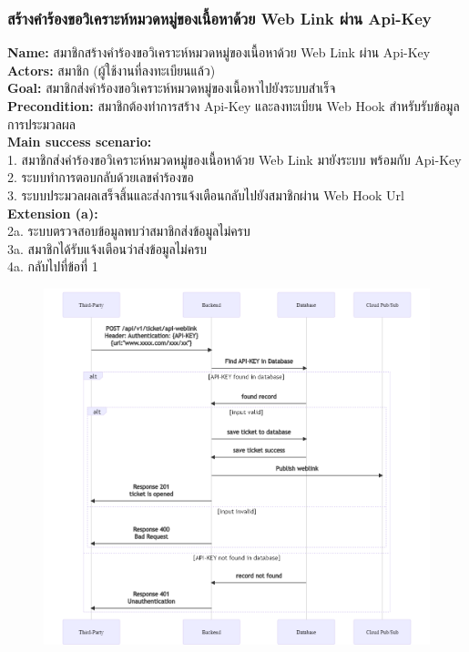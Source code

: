 \documentclass[12pt,oneside,openright,a4paper]{cpe-thai-project}
\begin{document}
\begin{itemize}
\subsubsection{สร้างคำร้องขอวิเคราะห์หมวดหมู่ของเนื้อหาด้วย Web Link ผ่าน Api-Key}
\textbf{Name: }สมาชิกสร้างคำร้องขอวิเคราะห์หมวดหมู่ของเนื้อหาด้วย Web Link ผ่าน Api-Key \\
\textbf{Actors: }สมาชิก (ผู้ใช้งานที่ลงทะเบียนแล้ว) \\
\textbf{Goal: }สมาชิกส่งคำร้องขอวิเคราะห์หมวดหมู่ของเนื้อหาไปยังระบบสำเร็จ \\
\textbf{Precondition: }สมาชิกต้องทำการสร้าง Api-Key และลงทะเบียน Web Hook สำหรับรับข้อมูลการประมวลผล \\
\textbf{Main success scenario: } \\
  \hspace*{0.5cm}1. สมาชิกส่งคำร้องขอวิเคราะห์หมวดหมู่ของเนื้อหาด้วย Web Link มายังระบบ พร้อมกับ Api-Key \\
  \hspace*{0.5cm}2. ระบบทำการตอบกลับด้วยเลขคำร้องขอ \\
  \hspace*{0.5cm}3. ระบบประมวลผลเสร็จสิ้นและส่งการแจ้งเตือนกลับไปยังสมาชิกผ่าน Web Hook Url  \\
\textbf{Extension (a): } \\
  \hspace*{0.5cm}2a. ระบบตรวจสอบข้อมูลพบว่าสมาชิกส่งข้อมูลไม่ครบ \\
  \hspace*{0.5cm}3a. สมาชิกได้รับแจ้งเตือนว่าส่งข้อมูลไม่ครบ \\
  \hspace*{0.5cm}4a. กลับไปที่ข้อที่ 1 \newpage
\begin{figure}[!ht]\centering
  \includegraphics[width=\textwidth]{./img/seq_linkapi.png}

\end{figure}
\end{itemize}
\end{document}
